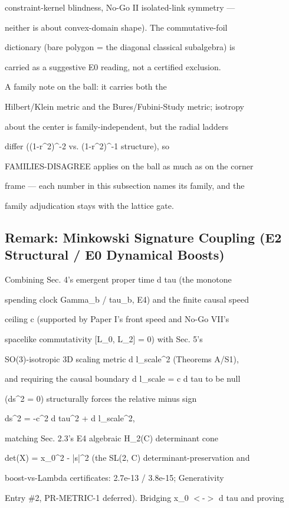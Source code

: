 \documentclass[11pt,a4paper]{article}
\theoremstyle{definition}
\begin{document}
constraint-kernel blindness, No-Go II isolated-link symmetry —

neither is about convex-domain shape). The commutative-foil

dictionary (bare polygon = the diagonal classical subalgebra) is

carried as a suggestive E0 reading, not a certified exclusion.

A family note on the ball: it carries both the

Hilbert/Klein metric and the Bures/Fubini-Study metric; isotropy

about the center is family-independent, but the radial ladders

differ ((1-r\^{}2)\^{}{-2} vs. (1-r\^{}2)\^{}{-1} structure), so

FAMILIES-DISAGREE applies on the ball as much as on the corner

frame — each number in this subsection names its family, and the

family adjudication stays with the lattice gate.



\subsection{Remark: Minkowski Signature Coupling (E2 Structural / E0 Dynamical Boosts)}

Combining Sec. 4's emergent proper time d tau (the monotone

spending clock Gamma\_b / tau\_b, E4) and the finite causal speed

ceiling c (supported by Paper I's front speed and No-Go VII's

spacelike commutativity [L\_0, L\_2] = 0) with Sec. 5's

SO(3)-isotropic 3D scaling metric d l\_scale\^{}2 (Theorems A/S1),

and requiring the causal boundary d l\_scale = c d tau to be null

(ds\^{}2 = 0) structurally forces the relative minus sign


    ds\^{}2 = -c\^{}2 d tau\^{}2 + d l\_scale\^{}2,


matching Sec. 2.3's E4 algebraic H\_2(C) determinant cone

det(X) = x\_0\^{}2 - |s|\^{}2 (the SL(2, C) determinant-preservation and

boost-vs-Lambda certificates: 2.7e-13 / 3.8e-15; Generativity

Entry \#2, PR-METRIC-1 deferred). Bridging x\_0 $<$-$>$ d tau and proving
\end{document}
